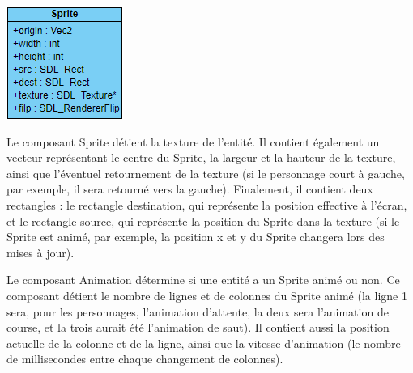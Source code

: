 \documentclass[12pt, openany]{report}
\begin{document}
\begin{minipage}{.35\textwidth}
\includegraphics[width=\textwidth]{sprite.png}
\end{minipage}
\hfill
\begin{minipage}{.6\textwidth}
\par Le composant Sprite d\'etient la texture de l'entit\'e. Il contient \'egalement un vecteur repr\'esentant le centre du Sprite, la largeur et la hauteur de la texture, ainsi que l'\'eventuel retournement de la texture (si le personnage court \`a gauche, par exemple, il sera retourn\'e vers la gauche). Finalement, il contient deux rectangles : le rectangle destination, qui repr\'esente la position effective \`a l'\'ecran, et le rectangle source, qui repr\'esente la position du Sprite dans la texture (si le Sprite est anim\'e, par exemple, la position x et y du Sprite changera lors des mises \`a jour).
\end{minipage}
\vspace{0.3cm}
\noindent
\begin{minipage}{.6\textwidth}
\par Le composant Animation d\'etermine si une entit\'e a un Sprite anim\'e ou non. Ce composant d\'etient le nombre de lignes et de colonnes du Sprite anim\'e (la ligne 1 sera, pour les personnages, l'animation d'attente, la deux sera l'animation de course, et la trois aurait \'et\'e l'animation de saut). Il contient aussi la position actuelle de la colonne et de la ligne, ainsi que la vitesse d'animation (le nombre de millisecondes entre chaque changement de colonnes).
\end{minipage}
\end{document}
